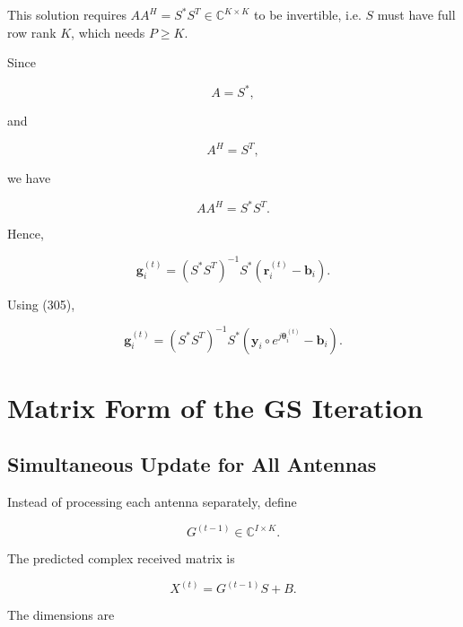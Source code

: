 \documentclass[12pt,a4paper]{article}
\begin{document}
This solution requires \(AA^H=S^*S^T\in\mathbb C^{K\times K}\) to be invertible, i.e.
\(S\) must have full row rank \(K\), which needs \(P\geq K\).

Since

\begin{equation}
A=S^*,
\tag{316}
\end{equation}

and

\begin{equation}
A^H=S^T,
\tag{317}
\end{equation}

we have

\begin{equation}
AA^H
=
S^*S^T.
\tag{318}
\end{equation}

Hence,

\begin{equation}
\boxed{
\mathbf g_i^{(t)}
=
(S^*S^T)^{-1}
S^*
\left(
\mathbf r_i^{(t)}-\mathbf b_i
\right)
}.
\tag{319}
\end{equation}

Using (305),

\begin{equation}
\boxed{
\mathbf g_i^{(t)}
=
(S^*S^T)^{-1}
S^*
\left(
\mathbf y_i
\circ
e^{j\boldsymbol{\theta}_i^{(t)}}
-
\mathbf b_i
\right)
}.
\tag{320}
\end{equation}

\section{Matrix Form of the GS Iteration}

\subsection{Simultaneous Update for All Antennas}

Instead of processing each antenna separately, define

\begin{equation}
\boxed{
G^{(t-1)}
\in
\mathbb C^{I\times K}
}.
\tag{321}
\end{equation}

The predicted complex received matrix is

\begin{equation}
\boxed{
X^{(t)}
=
G^{(t-1)}S+B
}.
\tag{322}
\end{equation}

The dimensions are
\end{document}
